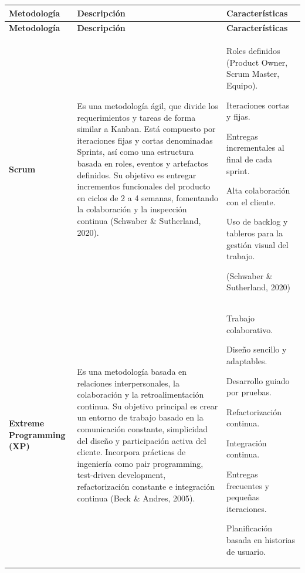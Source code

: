 {\small
\begin{longtable}{|L{2.4cm}|L{7.05cm}|L{5.2cm}|}
\hline
{} \textbf{Metodología} & \textbf{Descripción} & \textbf{Características} \\
\hline
\endfirsthead
\hline
{} \textbf{Metodología} & \textbf{Descripción} & \textbf{Características} \\
\hline
\endhead

\endfoot
\textbf{Scrum} & Es una metodología ágil, que divide los requerimientos y
tareas de forma similar a Kanban. Está compuesto por iteraciones fijas y cortas
denominadas Sprints, así como una estructura basada en roles, eventos y
artefactos definidos. Su objetivo es entregar incrementos funcionales del
producto en ciclos de 2 a 4 semanas, fomentando la colaboración y la
inspección continua (Schwaber \& Sutherland, 2020). &
\begin{tablista}
  \item Roles definidos (Product Owner, Scrum Master, Equipo).
  \item Iteraciones cortas y fijas.
  \item Entregas incrementales al final de cada sprint.
  \item Alta colaboración con el cliente.
  \item Uso de backlog y tableros para la gestión visual del trabajo.
  \item[] (Schwaber \& Sutherland, 2020)
\end{tablista} \\
\hline
\textbf{Extreme Programming (XP)} & Es una metodología basada en relaciones
interpersonales, la colaboración y la retroalimentación continua. Su objetivo
principal es crear un entorno de trabajo basado en la comunicación constante,
simplicidad del diseño y participación activa del cliente. Incorpora prácticas
de ingeniería como pair programming, test-driven development, refactorización
constante e integración continua (Beck \& Andres, 2005). &
\begin{tablista}
  \item Trabajo colaborativo.
  \item Diseño sencillo y adaptables.
  \item Desarrollo guiado por pruebas.
  \item Refactorización continua.
  \item Integración continua.
  \item Entregas frecuentes y pequeñas iteraciones.
  \item Planificación basada en historias de usuario.

\end{tablista}
\end{longtable}}
